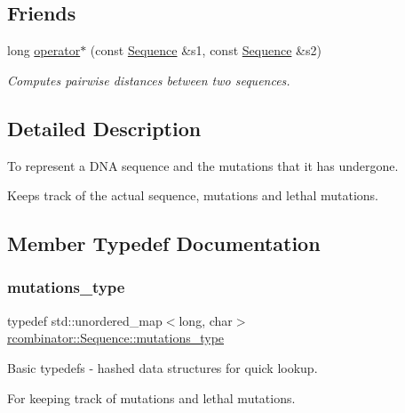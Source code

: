 \subsection*{Friends}
\begin{DoxyCompactItemize}
\item 
long \mbox{\hyperlink{classrcombinator_1_1Sequence_abdc71a8f6617dcb6ab73f0e07eb63b67}{operator$\ast$}} (const \mbox{\hyperlink{classrcombinator_1_1Sequence}{Sequence}} \&s1, const \mbox{\hyperlink{classrcombinator_1_1Sequence}{Sequence}} \&s2)
\begin{DoxyCompactList}\small\item\em Computes pairwise distances between two sequences. \end{DoxyCompactList}\end{DoxyCompactItemize}


\subsection{Detailed Description}
To represent a D\+NA sequence and the mutations that it has undergone. 

Keeps track of the actual sequence, mutations and lethal mutations. 

\subsection{Member Typedef Documentation}
\mbox{\label{classrcombinator_1_1Sequence_a95c6d1eea79f9551118a4c988433e5b7}} 
\subsubsection{\texorpdfstring{mutations\+\_\+type}{mutations\_type}}
{\footnotesize\ttfamily typedef std\+::unordered\+\_\+map$<$long, char$>$ \mbox{\hyperlink{classrcombinator_1_1Sequence_a95c6d1eea79f9551118a4c988433e5b7}{rcombinator\+::\+Sequence\+::mutations\+\_\+type}}\hspace{0.3cm}{\ttfamily [private]}}



Basic typedefs -\/ hashed data structures for quick lookup. 

For keeping track of mutations and lethal mutations. 

